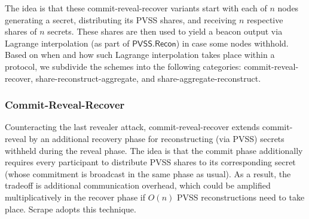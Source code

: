\documentclass[letterpaper,twocolumn,10pt]{article}
\theoremstyle{definition}
\theoremstyle{remark}
\begin{document}
The idea is that these commit-reveal-recover variants start with each of $n$ nodes generating a secret, distributing its PVSS shares, and receiving $n$ respective shares of $n$ secrets. These shares are then used to yield a beacon output via Lagrange interpolation (as part of $\mathsf{PVSS.Recon}$) in case some nodes withhold. Based on when and how such Lagrange interpolation takes place within a protocol, we subdivide the schemes into the following categories: commit-reveal-recover, share-reconstruct-aggregate, and share-aggregate-reconstruct.

\subsubsection{Commit-Reveal-Recover}
Counteracting the last revealer attack, commit-reveal-recover extends commit-reveal by an additional recovery phase for reconstructing (via PVSS) secrets withheld during the reveal phase. The idea is that the commit phase additionally requires every participant to distribute PVSS shares to its corresponding secret (whose commitment is broadcast in the same phase as usual). As a result, the tradeoff is additional communication overhead, which could be amplified multiplicatively in the recover phase if $O(n)$ PVSS reconstructions need to take place. Scrape \cite{cascudo2017scrape} adopts this technique.\\
\end{document}
